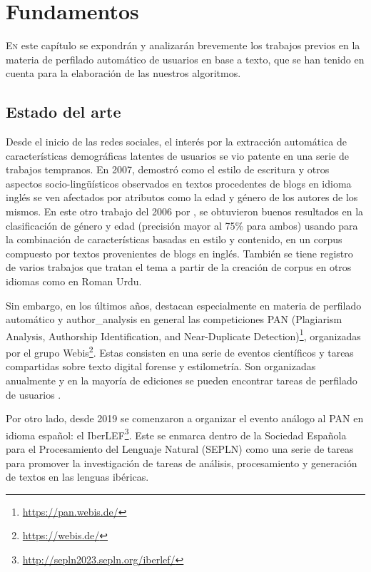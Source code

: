 \chapter{Fundamentos}
\label{chap:fundamentos}
\lettrine{E}{n} este capítulo se expondrán y analizarán brevemente los trabajos previos en la materia de perfilado automático de usuarios en base a texto, que se han tenido en cuenta para la elaboración de las nuestros algoritmos.

\section{Estado del arte}%

\label{sec:estado_arte}
Desde el inicio de las redes sociales, el interés por la extracción automática de características demográficas latentes de usuarios se vio patente en una serie de trabajos tempranos. En 2007, \citet{ap_argamon_07} demostró como el estilo de escritura y otros aspectos socio-lingüísticos observados en textos procedentes de blogs en idioma inglés se ven afectados por atributos como la edad y género de los autores de los mismos. En este otro trabajo del 2006 por \citet{ap_argamon_06}, se obtuvieron buenos resultados en la clasificación de género y edad (precisión mayor al 75\% para ambos) usando para la combinación de características basadas en estilo y  contenido, en un corpus compuesto por textos provenientes de blogs en inglés. También se tiene registro de varios trabajos que tratan el tema a partir de la creación de corpus en otros idiomas como \citet{profiling_urdu} en Roman Urdu.

Sin embargo, en los últimos años, destacan especialmente en materia de perfilado automático y \gls{author_analysis} en general las competiciones PAN (Plagiarism Analysis, Authorship Identification, and Near-Duplicate Detection)\footnote{\url{https://pan.webis.de/}}, organizadas por el grupo Webis\footnote{\url{https://webis.de/}}. Estas consisten en una serie de eventos científicos y tareas compartidas sobre texto digital forense y estilometría. Son organizadas anualmente y en la mayoría de ediciones se pueden encontrar tareas de perfilado de usuarios \citep{pan:2014,pan:2015,pan:2016}.

Por otro lado, desde 2019 se comenzaron a organizar el evento análogo al PAN en idioma español: el IberLEF\footnote{\url{http://sepln2023.sepln.org/iberlef/}}. Este se enmarca dentro de la Sociedad Española para el Procesamiento del Lenguaje Natural (SEPLN) como una serie de tareas para promover la investigación de tareas de análisis, procesamiento y generación de textos en las lenguas ibéricas.

